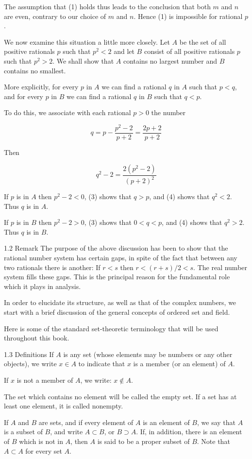 \documentclass[10pt]{article}
\begin{document}
The assumption that (1) holds thus leads to the conclusion that both $m$ and $n$ are even, contrary to our choice of $m$ and $n$. Hence (1) is impossible for rational $p$.

We now examine this situation a little more closely. Let $A$ be the set of all positive rationals $p$ such that $p^{2}<2$ and let $B$ consist of all positive rationals $p$ such that $p^{2}>2$. We shall show that $A$ contains no largest number and $B$ contains no smallest.

More explicitly, for every $p$ in $A$ we can find a rational $q$ in $A$ such that $p<q$, and for every $p$ in $B$ we can find a rational $q$ in $B$ such that $q<p$.

To do this, we associate with each rational $p>0$ the number

$$
q=p-\frac{p^{2}-2}{p+2}=\frac{2 p+2}{p+2}
$$

Then

$$
q^{2}-2=\frac{2\left(p^{2}-2\right)}{(p+2)^{2}}
$$

If $p$ is in $A$ then $p^{2}-2<0$, (3) shows that $q>p$, and (4) shows that $q^{2}<2$. Thus $q$ is in $A$.

If $p$ is in $B$ then $p^{2}-2>0$, (3) shows that $0<q<p$, and (4) shows that $q^{2}>2$. Thus $q$ is in $B$.

1.2 Remark The purpose of the above discussion has been to show that the rational number system has certain gaps, in spite of the fact that between any two rationals there is another: If $r<s$ then $r<(r+s) / 2<s$. The real number system fills these gaps. This is the principal reason for the fundamental role which it plays in analysis.

In order to elucidate its structure, as well as that of the complex numbers, we start with a brief discussion of the general concepts of ordered set and field.

Here is some of the standard set-theoretic terminology that will be used throughout this book.

1.3 Definitions If $A$ is any set (whose elements may be numbers or any other objects), we write $x \in A$ to indicate that $x$ is a member (or an element) of $A$.

If $x$ is not a member of $A$, we write: $x \notin A$.

The set which contains no element will be called the empty set. If a set has at least one element, it is called nonempty.

If $A$ and $B$ are sets, and if every element of $A$ is an element of $B$, we say that $A$ is a subset of $B$, and write $A \subset B$, or $B \supset A$. If, in addition, there is an element of $B$ which is not in $A$, then $A$ is said to be a proper subset of $B$. Note that $A \subset A$ for every set $A$.
\end{document}
